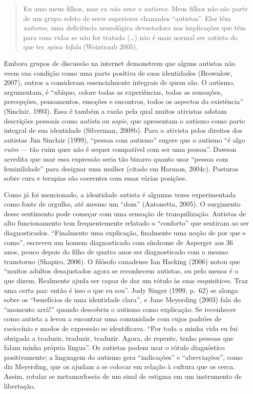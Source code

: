 \begin{quote}
Eu amo meus filhos, mas \emph{eu não amo o autismo}. Meus filhos não são
parte de um grupo seleto de seres superiores chamados ``autistas''. Eles
têm \emph{autismo}, uma deficiência neurológica devastadora nas
implicações que têm para suas vidas se não for tratada (\ldots{}) não é mais
normal ser autista do que ter \emph{spina bifida} (Weintraub 2005).
\end{quote}

Embora grupos de discussão na internet demonstrem que alguns autistas
não veem sua condição como uma parte positiva de suas identidades
(Brownlow, 2007), outros a consideram essencialmente integrais de quem
são. O autismo, argumentam, é ``ubíquo, colore todas as experiências,
todas as sensações, percepções, pensamentos, emoções e encontros, todos
os aspectos da existência'' (Sinclair, 1993). Essa é também a razão pela
qual muitos ativistas adotam descrições pessoais como \emph{autista} ou
\emph{aspie}, que apresentam o autismo como parte integral de sua
identidade (Silverman, 2008b). Para o ativista pelos direitos dos
autistas Jim Sinclair (1999), ``pessoa com autismo'' sugere que o
autismo ``é algo \emph{ruim} --- tão ruim quer não é sequer compatível
com ser uma pessoa''. Dawson acredita que usar essa expressão seria tão
bizarro quanto usar ``pessoa com feminilidade'' para designar uma mulher
(citado em Harmon, 2004c). Posturas sobre cura e terapias são coerentes
com essas várias posições.

Como já foi mencionado, a identidade autista é algumas vezes
experimentada como fonte de orgulho, até mesmo um ``dom'' (Antonetta,
2005). O surgimento desse sentimento pode começar com uma sensação de
tranquilização. Autistas de alto funcionamento tem frequentemente
relatado o ``conforto'' que sentiram ao ser diagnosticados. ``Finalmente
uma explicação, finalmente uma noção de por que e como'', escreveu um
homem diagnosticado com síndrome de Asperger aos 36 anos, pouco depois
do filho de quatro anos ser diagnosticado com o mesmo transtorno
(Shapiro, 2006). O filósofo canadense Ian Hacking (2006) notou que
``muitos adultos desajustados agora se reconhecem autistas, ou pelo
menos é o que dizem. Realmente ajuda ser capaz de dar um rótulo às suas
esquisitices. Traz uma certa paz: então é isso o que eu sou''. Judy
Singer (1999, p.~62) se alonga sobre os ``benefícios de uma identidade
clara'', e Jane Meyerding (2003) fala do ``momento arrá!'' quando
descobriu o autismo como explicação. Se reconhecer como autista a levou
a encontrar uma comunidade com cujos padrões de raciocínio e modos de
expressão se identificava. ``Por toda a minha vida eu fui obrigada a
traduzir, traduzir, traduzir. Agora, de repente, tenho pessoas que falam
minha própria língua''. Os autistas podem usar o rótulo diagnóstico
positivamente; a linguagem do autismo gera ``indicações'' e
``abreviações'', como diz Meyerding, que os ajudam a se colocar em
relação à cultura que os cerca. Assim, rotular se metamorfoseia de um
sinal de estigma em um instrumento de libertação.

